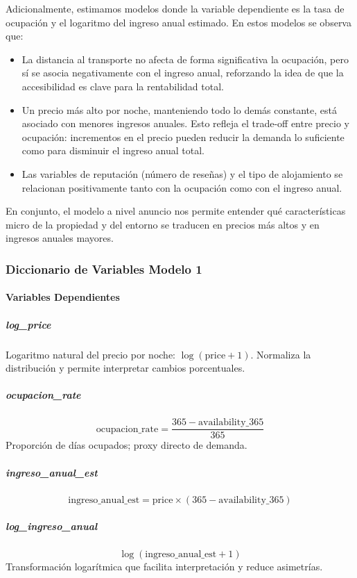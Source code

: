 \documentclass[12pt]{article}
\begin{document}
Adicionalmente, estimamos modelos donde la variable dependiente es la tasa de ocupación y el logaritmo del ingreso anual estimado. En estos modelos se observa que:

\begin{itemize}
  \item La distancia al transporte no afecta de forma significativa la ocupación, pero sí se asocia negativamente con el ingreso anual, reforzando la idea de que la accesibilidad es clave para la rentabilidad total.
  \item Un precio más alto por noche, manteniendo todo lo demás constante, está asociado con menores ingresos anuales. Esto refleja el trade-off entre precio y ocupación: incrementos en el precio pueden reducir la demanda lo suficiente como para disminuir el ingreso anual total.
  \item Las variables de reputación (número de reseñas) y el tipo de alojamiento se relacionan positivamente tanto con la ocupación como con el ingreso anual.
\end{itemize}

En conjunto, el modelo a nivel anuncio nos permite entender qué características micro de la propiedad y del entorno se traducen en precios más altos y en ingresos anuales mayores.

\subsubsection*{Diccionario de Variables Modelo 1}

\paragraph{Variables Dependientes}
\subparagraph{log\_price}
Logaritmo natural del precio por noche: $\log(\text{price} + 1)$. Normaliza la distribución y permite interpretar cambios porcentuales.

\subparagraph{ocupacion\_rate}
\[
\text{ocupacion\_rate} = \frac{365 - \text{availability\_365}}{365}
\]
Proporción de días ocupados; proxy directo de demanda.

\subparagraph{ingreso\_anual\_est}
\[
\text{ingreso\_anual\_est} = \text{price} \times (365 - \text{availability\_365})
\]

\subparagraph{log\_ingreso\_anual}
\[
\log(\text{ingreso\_anual\_est} + 1)
\]
Transformación logarítmica que facilita interpretación y reduce asimetrías.
\end{document}
